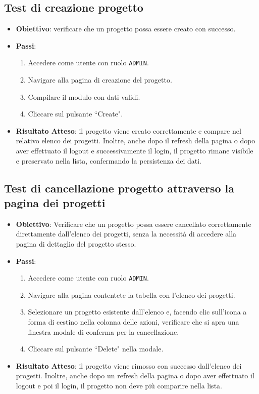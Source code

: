 \documentclass[target=bach,aauheader=,style=]{thud}
\begin{document}
\subsection{Test di creazione progetto}
\begin{itemize}
    \item \textbf{Obiettivo}: verificare che un progetto possa essere creato con successo.
    \item \textbf{Passi}:
    \begin{enumerate}
        \item Accedere come utente con ruolo \texttt{ADMIN}.
        \item Navigare alla pagina di creazione del progetto.
        \item Compilare il modulo con dati validi.
        \item Cliccare sul pulsante ``Create".
    \end{enumerate}
    \item \textbf{Risultato Atteso}: il progetto viene creato correttamente e compare nel relativo elenco dei progetti. Inoltre, anche dopo il refresh della pagina o dopo aver effettuato il logout e successivamente il login, il progetto rimane visibile e preservato nella lista, confermando la persistenza dei dati.
\end{itemize}

\subsection{Test di cancellazione progetto attraverso la pagina dei progetti}
\begin{itemize}
    \item \textbf{Obiettivo}: Verificare che un progetto possa essere cancellato correttamente direttamente dall'elenco dei progetti, senza la necessità di accedere alla pagina di dettaglio del progetto stesso.
    \item \textbf{Passi}:
    \begin{enumerate}
        \item Accedere come utente con ruolo \texttt{ADMIN}.
        \item Navigare alla pagina contentete la tabella con l'elenco dei progetti.
        \item Selezionare un progetto esistente dall'elenco e, facendo clic sull'icona a forma di cestino nella colonna delle azioni, verificare che si apra una finestra modale di conferma per la cancellazione.
        \item Cliccare sul pulsante ``Delete" nella modale.
    \end{enumerate}
    \item \textbf{Risultato Atteso}: il progetto viene rimosso con successo dall'elenco dei progetti. Inoltre, anche dopo un refresh della pagina o dopo aver effettuato il logout e poi il login, il progetto non deve più comparire nella lista.
\end{itemize}
\end{document}
